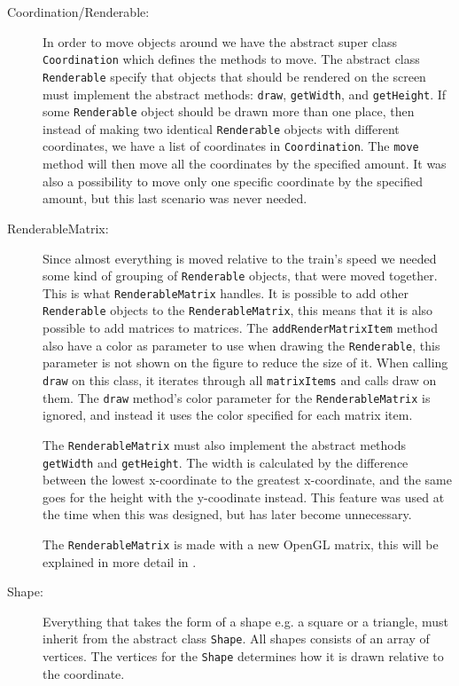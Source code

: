 \begin{description}
\item[Coordination/Renderable:] In order to move objects around we have the abstract super class \lstinline|Coordination| which defines the methods to move. The abstract class \lstinline|Renderable| specify that objects that should be rendered on the screen must implement the abstract methods: \lstinline|draw|, \lstinline|getWidth|, and \lstinline|getHeight|. If some \lstinline|Renderable| object should be drawn more than one place, then instead of making two identical \lstinline|Renderable| objects with different coordinates, we have a list of coordinates in \lstinline|Coordination|. The \lstinline|move| method will then move all the coordinates by the specified amount. It was also a possibility to move only one specific coordinate by the specified amount, but this last scenario was never needed.

\item[RenderableMatrix:] Since almost everything is moved relative to the train's speed we needed some kind of grouping of \lstinline|Renderable| objects, that were moved together. This is what \lstinline|RenderableMatrix| handles. It is possible to add other \lstinline|Renderable| objects to the \lstinline|RenderableMatrix|, this means that it is also possible to add matrices to matrices. The \lstinline|addRenderMatrixItem| method also have a color as parameter to use when drawing the \lstinline|Renderable|, this parameter is not shown on the figure to reduce the size of it. When calling \lstinline|draw| on this class, it iterates through all \lstinline|matrixItems| and calls draw on them. The \lstinline|draw| method's color parameter for the \lstinline|RenderableMatrix| is ignored, and instead it uses the color specified for each matrix item.

The \lstinline|RenderableMatrix| must also implement the abstract methods \lstinline|getWidth| and \lstinline|getHeight|. The width is calculated by the difference between the lowest x-coordinate to the greatest x-coordinate, and the same goes for the height with the y-coodinate instead. This feature was used at the time when this was designed, but has later become unnecessary.

The \lstinline|RenderableMatrix| is made with a new OpenGL matrix, this will be explained in more detail in .

\item[Shape:] Everything that takes the form of a shape e.g. a square or a triangle, must inherit from the abstract class \lstinline|Shape|. All shapes consists of an array of vertices. The vertices for the \lstinline|Shape| determines how it is drawn relative to the coordinate.


\end{description}
